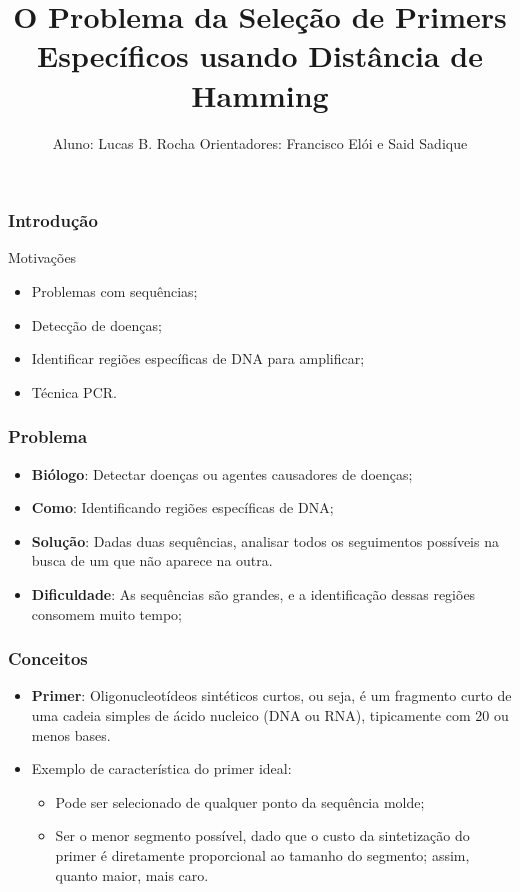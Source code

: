 \documentclass[10pt, compress]{beamer}
\title{O Problema da Seleção de Primers Específicos usando Distância de Hamming}
\subtitle{}
\author{Aluno: Lucas B. Rocha \newline Orientadores: Francisco Elói e Said Sadique}
\institute{Universidade Federal de Mato Grosso do Sul}
\begin{document}
\maketitle

\begin{frame}[fragile]
	\frametitle{Introdução}
    
    \alert{Motivações}
    
    \begin{itemize}
    	\item Problemas com sequências; \pause
        \item Detecção de doenças; \pause
        \item Identificar regiões específicas de DNA para amplificar; \pause
        \item Técnica PCR.
    \end{itemize}
    
\end{frame}

\begin{frame}[fragile]
	\frametitle{Problema}
  	\begin{itemize}
  		\item \textbf{Biólogo}: Detectar doenças ou agentes causadores de doenças;
        \item \textbf{Como}: Identificando regiões específicas de DNA;
        \item \textbf{Solução}: Dadas duas sequências, analisar todos os seguimentos possíveis na busca de um que não aparece na outra.
        \item \textbf{Dificuldade}: As sequências são grandes, e a identificação dessas regiões consomem muito tempo;
	\end{itemize}
\end{frame}

\begin{frame}[fragile]
	\frametitle{Conceitos}
    \begin{itemize}
        \item \textbf{Primer}:  Oligonucleotídeos sintéticos curtos, ou seja, é um fragmento curto de uma cadeia simples de ácido nucleico (DNA ou RNA), tipicamente com 20 ou menos bases.
        
        \vspace{0.5cm} \pause
        
        \item Exemplo de característica do primer ideal:
        	\begin{itemize}
        		\item Pode ser selecionado de qualquer ponto da sequência molde;
				\item Ser o menor segmento possível, dado que o custo da sintetização do primer é
diretamente proporcional ao tamanho do segmento; assim, quanto maior, mais
caro.
			\end{itemize}
    \end{itemize}
\end{frame}
\end{document}
